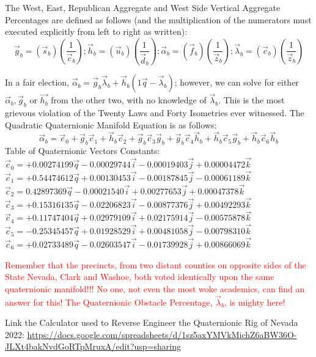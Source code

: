 \documentclass[preprint,13pt]{elsarticle}
\begin{document}
The West, East, Republican Aggregate and West Side Vertical Aggregate Percentages are defined as follows (and the multiplication of the numerators must executed explicitly from left to right as written):
$$\vec{g}_{b}=\left(\vec{s}_{b}\right)\left(\frac{1}{\vec{c}_{b}}\right); \vec{h}_{b}=\left(\vec{u}_{b}\right)\left(\frac{1}{\vec{d}_{b}}\right);
\vec{\alpha}_{b}=\left(\vec{f}_{b}\right)\left(\frac{1}{\vec{z}_{b}}\right);
\vec{\lambda}_{b}=\left(\vec{c}_{b}\right)\left(\frac{1}{\vec{z}_{b}}\right)$$

In a fair election, $\vec{\alpha}_{b}=\vec{g}_{b}\vec{\lambda}_{b}+\vec{h}_{b}\left(1\vec{q}-\vec{\lambda}_{b}\right)$; however, we can solve for either $\vec{\alpha}_{b}, \vec{g}_{b}$ or $\vec{h_{b}}$ from the other two, with no knowledge of $\vec{\lambda}_{b}$. This is the most grievous violation of the Twenty Laws and Forty Isometries ever witnessed.
\newpage
The Quadratic Quaternionic Manifold Equation is as follows:
$$\vec{\alpha}_b=\vec{c}_{0}+\vec{g}_{b}\vec{c}_{1}+\vec{h}_{b}\vec{c}_{2}+\vec{g}_{b}\vec{c}_{3}\vec{g}_{b}+\vec{g}_{b}\vec{c}_{4}\vec{h}_{b}+\vec{h}_{b}\vec{c}_{5}\vec{g}_{b}+\vec{h}_{b}\vec{c}_{6}\vec{h}_{b}$$
Table of Quaternionic Vectors Constants:\\
$\vec{c}_{0}=+0.00274199\vec{q}-0.00029744\vec{i}-0.00019403\vec{j}+0.00004472\vec{k}$\\
$\vec{c}_{1}=+0.54474612\vec{q}+0.00130453\vec{i}-0.00187845\vec{j}-0.00061189\vec{k}$\\
$\vec{c}_{2}=0.42897369\vec{q}-0.00021540\vec{i}+0.00277653\vec{j}+0.00047378\vec{k}$\\
$\vec{c}_{3}=+0.15316135\vec{q}-0.02206823\vec{i}-0.00877376\vec{j}+0.00492293\vec{k}$\\
$\vec{c}_{4}=+0.11747404\vec{q}+0.02979109\vec{i}+0.02175914\vec{j}-0.00575878\vec{k}$\\
$\vec{c}_{5}=-0.25345457\vec{q}+0.01928529\vec{i}+0.00481058\vec{j}-0.00798310\vec{k}$\\
$\vec{c}_{6}=+0.02733489\vec{q}-0.02603547\vec{i}-0.01739928\vec{j}+0.00866069\vec{k}$

\textcolor{red}{Remember that the precincts, from two distant counties on opposite sides of the State Nevada, Clark and Washoe, both voted identically upon the same quaternionic manifold!!! No one, not even the most woke academics, can find an answer for this! The Quaternionic Obstacle Percentage, $\vec{\lambda}_{b}$, is mighty here!}

Link the Calculator used to Reverse Engineer the Quaternionic Rig of Nevada 2022:
\url{https://docs.google.com/spreadsheets/d/1sz5axYMVkMichZ6aBW36O-JLXt4bakNvdGoRTpMruxA/edit?usp=sharing}
\end{document}
